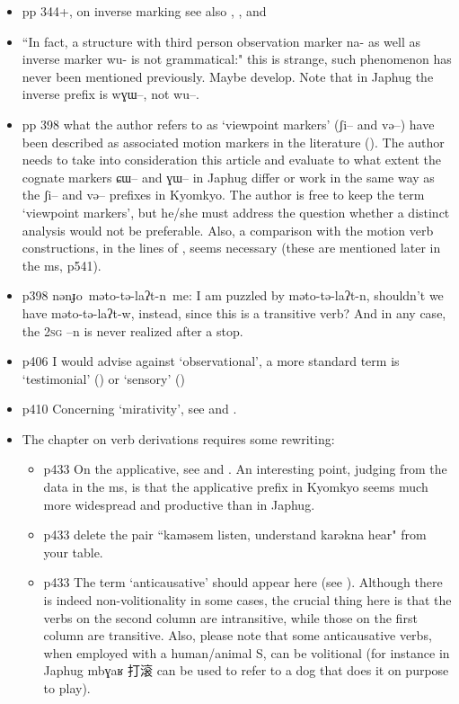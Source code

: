 \documentclass[oldfontcommands,oneside,a4paper,11pt]{article}
\newcommand{\ipa}[1]{{\phon \mbox{#1}}} %
\newcommand{\zh}[1]{{\cn #1}}
\begin{document}
\begin{itemize}
\item pp 344+, on inverse marking see also \citet{gongxun14agreement}, \citet{jacques14inverse}, \citet{jacques14rtau} and \citet{lai14person}
\item ``In fact, a structure with third person observation marker na- as well as inverse marker wu- is not
grammatical:" this is strange, such phenomenon has never been mentioned previously. Maybe develop. Note that in Japhug the inverse prefix is \ipa{wɣɯ--}, not \ipa{wu--}.
\item pp 398 what the author refers to as `viewpoint markers' (\ipa{ʃi--} and \ipa{və--}) have been described as associated motion markers in the literature (\citealt{jacques13harmonization}). The author needs to take into consideration this article and evaluate to what extent the cognate markers \ipa{ɕɯ--} and \ipa{ɣɯ--} in Japhug differ or work in the same way as the \ipa{ʃi--} and \ipa{və--} prefixes in Kyomkyo. The author is free to keep the term `viewpoint markers', but he/she must address  the question whether a distinct analysis would not be preferable. Also, a comparison with the motion verb constructions, in the lines of \citet[203]{jacques13harmonization}, seems necessary (these are mentioned later in the ms, p541).
\item p398 \ipa{nənɟo məto-tə-laʔt-n me}: I am puzzled by \ipa{məto-tə-laʔt-n}, shouldn't we have \ipa{məto-tə-laʔt-w}, instead, since this is a transitive verb? And in any case, the \textsc{2sg} \ipa{--n} is never realized after a stop.
\item p406 I would advise against `observational', a more standard term is `testimonial' (\citealt{hill13hdug}) or `sensory' (\citealt{tournadre14evidentiality})
\item p410 Concerning `mirativity', see \citet{hill13hdug} and \citealt{tournadre14evidentiality}.
\item The chapter on verb derivations requires some rewriting:
\begin{itemize}
\item p433 On the applicative, see \citet{jacques13tropative} and \citet{jackson14morpho}. An interesting point, judging from the data in the ms, is that the applicative prefix in Kyomkyo seems much more widespread and productive than in Japhug. 
\item p433 delete the pair ``\ipa{kaməsem} listen, understand \ipa{karəkna} hear" from your table.
\item  p433 The term `anticausative' should appear here (see \citealt{jacques12demotion}). Although there is indeed non-volitionality in some cases, the crucial thing here is that the verbs on the second column are intransitive, while those on the first column are transitive. Also, please note that some anticausative verbs, when employed with a human/animal S, can be volitional (for instance in Japhug \ipa{mbɣaʁ} \zh{打滚}  can be used to refer to a dog that does it on purpose to play).

\end{itemize}
\end{itemize}
\end{document}
